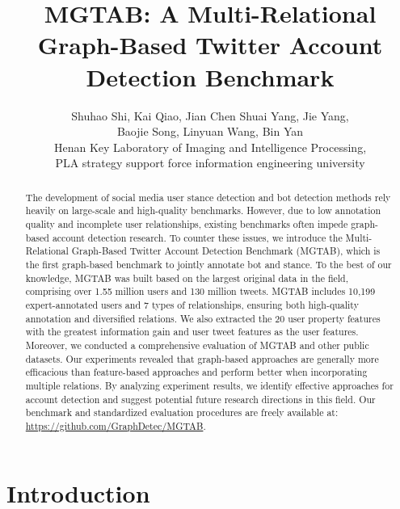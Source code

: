 \documentclass[10pt,twocolumn,letterpaper]{article}
\begin{document}
\title{MGTAB: A Multi-Relational Graph-Based Twitter Account Detection Benchmark}

\author{Shuhao Shi, Kai Qiao, Jian Chen Shuai Yang, Jie Yang,\\
Baojie Song, Linyuan Wang, Bin Yan\\
Henan Key Laboratory of Imaging and Intelligence Processing,\\ PLA strategy support force information engineering university\\
\vspace*{-0.3cm}
}

\maketitle
\ificcvfinal\thispagestyle{empty}\fi


\begin{abstract}
\vspace*{-0.2cm}
The development of social media user stance detection and bot detection methods rely heavily on large-scale and high-quality benchmarks. However, due to low annotation quality and incomplete user relationships, existing benchmarks often impede graph-based account detection research. To counter these issues, we introduce the Multi-Relational Graph-Based Twitter Account Detection Benchmark (MGTAB), which is the first graph-based benchmark to jointly annotate bot and stance. To the best of our knowledge, MGTAB was built based on the largest original data in the field, comprising over 1.55 million users and 130 million tweets. MGTAB includes 10,199 expert-annotated users and 7 types of relationships, ensuring both high-quality annotation and diversified relations. We also extracted the 20 user property features with the greatest information gain and user tweet features as the user features. Moreover, we conducted a comprehensive evaluation of MGTAB and other public datasets. Our experiments revealed that graph-based approaches are generally more efficacious than feature-based approaches and perform better when incorporating multiple relations. By analyzing experiment results, we identify effective approaches for account detection and suggest potential future research directions in this field. Our benchmark and standardized evaluation procedures are freely available at: \small{\url{https://github.com/GraphDetec/MGTAB}}.
\vspace*{-0.35cm}
\end{abstract}

\section{Introduction}
\end{document}
